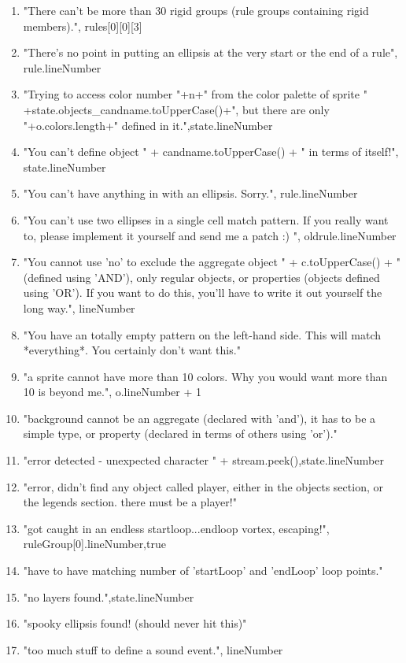 \begin{enumerate}
    \item "There can't be more than 30 rigid groups (rule groups containing rigid members).", rules[0][0][3]
    \item "There's no point in putting an ellipsis at the very start or the end of a rule", rule.lineNumber
    \item "Trying to access color number "+n+" from the color palette of sprite " +state.objects\_candname.toUpperCase()+", but there are only "+o.colors.length+" defined in it.",state.lineNumber
    \item "You can't define object " + candname.toUpperCase() + " in terms of itself!", state.lineNumber
    \item "You can't have anything in with an ellipsis. Sorry.", rule.lineNumber
    \item "You can't use two ellipses in a single cell match pattern.  If you really want to, please implement it yourself and send me a patch :) ", oldrule.lineNumber
    \item "You cannot use 'no' to exclude the aggregate object " + c.toUpperCase() + " (defined using 'AND'), only regular objects, or properties (objects defined using 'OR').  If you want to do this, you'll have to write it out yourself the long way.", lineNumber
    \item "You have an totally empty pattern on the left-hand side.  This will match *everything*.  You certainly don't want this."
    \item "a sprite cannot have more than 10 colors.  Why you would want more than 10 is beyond me.", o.lineNumber + 1
    \item "background cannot be an aggregate (declared with 'and'), it has to be a simple type, or property (declared in terms of others using 'or')."
    \item "error detected - unexpected character " + stream.peek(),state.lineNumber
    \item "error, didn't find any object called player, either in the objects section, or the legends section. there must be a player!"
    \item "got caught in an endless startloop...endloop vortex, escaping!", ruleGroup[0].lineNumber,true
    \item "have to have matching number of  'startLoop' and 'endLoop' loop points."
    \item "no layers found.",state.lineNumber
    \item "spooky ellipsis found! (should never hit this)"
    \item "too much stuff to define a sound event.", lineNumber

\end{enumerate}
